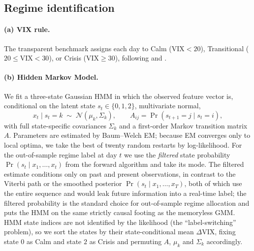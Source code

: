 \documentclass[12pt,a4paper]{article}
\newcommand{\dvix}{\Delta\mathrm{VIX}}
\begin{document}
\subsection{Regime identification}

\paragraph{(a) VIX rule.}
The transparent benchmark assigns each day to Calm ($\mathrm{VIX}<20$), Transitional
($20\le\mathrm{VIX}<30$), or Crisis ($\mathrm{VIX}\ge30$), following \citet{whaley2009}
and \citet{bloom2009}.

\paragraph{(b) Hidden Markov Model.}
We fit a three-state Gaussian HMM in which the observed feature vector is, conditional on
the latent state $s_t\in\{0,1,2\}$, multivariate normal,
\begin{equation}
  x_t \mid s_t=k \;\sim\; \mathcal{N}(\mu_k,\Sigma_k),
  \qquad
  A_{ij}=\Pr(s_{t+1}=j\mid s_t=i),
\end{equation}
with full state-specific covariances $\Sigma_k$ and a first-order Markov transition
matrix $A$. Parameters are estimated by Baum--Welch EM; because EM converges only to
local optima, we take the best of twenty random restarts by log-likelihood. For the
out-of-sample regime label at day $t$ we use the \emph{filtered} state probability
$\Pr(s_t\mid x_1,\dots,x_t)$ from the forward algorithm and take its mode. The filtered
estimate conditions only on past and present observations, in contrast to the Viterbi path
or the smoothed posterior $\Pr(s_t\mid x_1,\dots,x_T)$, both of which use the entire
sequence and would leak future information into a real-time label; the filtered probability
is the standard choice for out-of-sample regime allocation \citep{hamilton1989,
angtimmermann2012} and puts the HMM on the same strictly causal footing as the memoryless
GMM. HMM state indices are not identified by the likelihood (the ``label-switching''
problem), so we sort the states by their state-conditional mean $\dvix$, fixing state $0$
as Calm and state $2$ as Crisis and permuting $A$, $\mu_k$ and $\Sigma_k$ accordingly.
\end{document}
